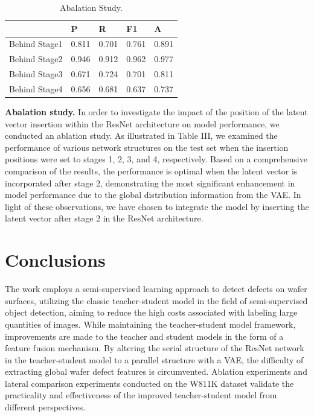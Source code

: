 \documentclass[conference]{IEEEtran}
\begin{document}
\begin{table}[!t]
    \centering
    \setlength{\tabcolsep}{1.5mm}
    \caption{Abalation Study.}
    \label{tab:2}
    \begin{tabular}{lllll}
        \hline
        & P & R & F1 & A \\ 
        \hline
        Behind Stage1 & 0.811 & 0.701 & 0.761 & 0.891 \\ 
        \hline
        Behind Stage2 & 0.946 & 0.912 & 0.962 & 0.977 \\ 
        \hline
        Behind Stage3 & 0.671 & 0.724 & 0.701 & 0.811 \\ 
        \hline
        Behind Stage4 & 0.656 & 0.681 & 0.637 & 0.737 \\ 
        \hline
    \end{tabular}
\end{table}


\noindent\textbf{Abalation study.} In order to investigate the impact of the position of the latent vector insertion within the ResNet architecture on model performance, we conducted an ablation study. As illustrated in Table III, we examined the performance of various network structures on the test set when the insertion positions were set to stages 1, 2, 3, and 4, respectively. Based on a comprehensive comparison of the results, the performance is optimal when the latent vector is incorporated after stage 2, demonstrating the most significant enhancement in model performance due to the global distribution information from the VAE. In light of these observations, we have chosen to integrate the model by inserting the latent vector after stage 2 in the ResNet architecture.




\section{Conclusions}
%
The work employs a semi-supervised learning approach to detect defects on wafer surfaces, utilizing the classic teacher-student model in the field of semi-supervised object detection, aiming to reduce the high costs associated with labeling large quantities of images. While maintaining the teacher-student model framework, improvements are made to the teacher and student models in the form of a feature fusion mechanism. By altering the serial structure of the ResNet network in the teacher-student model to a parallel structure with a VAE, the difficulty of extracting global wafer defect features is circumvented. Ablation experiments and lateral comparison experiments conducted on the W811K dataset validate the practicality and effectiveness of the improved teacher-student model from different perspectives.







\end{document}
